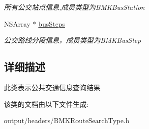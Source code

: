 \begin{DoxyCompactItemize}
\begin{DoxyCompactList}\small\item\em 所有公交站点信息,成员类型为\+B\+M\+K\+Bus\+Station \end{DoxyCompactList}\item 
\hypertarget{interface_b_m_k_bus_line_result_acbb640c72f6b2649ee131c95fd826407}{}N\+S\+Array $\ast$ \hyperlink{interface_b_m_k_bus_line_result_acbb640c72f6b2649ee131c95fd826407}{bus\+Steps}\label{interface_b_m_k_bus_line_result_acbb640c72f6b2649ee131c95fd826407}

\begin{DoxyCompactList}\small\item\em 公交路线分段信息，成员类型为\+B\+M\+K\+Bus\+Step \end{DoxyCompactList}\end{DoxyCompactItemize}


\subsection{详细描述}
此类表示公共交通信息查询结果 

该类的文档由以下文件生成\+:\begin{DoxyCompactItemize}
\item 
output/headers/B\+M\+K\+Route\+Search\+Type.\+h\end{DoxyCompactItemize}
